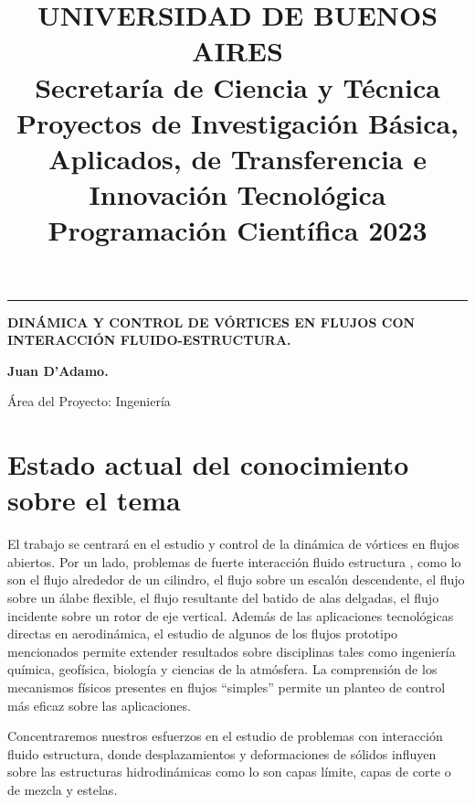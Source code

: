 \documentclass[12pt]{article}
\title{UNIVERSIDAD DE BUENOS AIRES\\Secretaría de Ciencia y Técnica\\ \large{Proyectos de Investigación Básica, Aplicados, de Transferencia e Innovación Tecnológica  Programación Científica 2023}}
\date{}
\begin{document}
    \vspace*{-4cm}
{\let\newpage\relax\maketitle}	
\thispagestyle{empty}
    \vspace*{-1cm}
\noindent \rule{ \linewidth,\parindent=0pt}{0.5mm}

\begin{tcolorbox}[colback=black!20!white,colframe=black,arc=0mm,left=0mm,top=0mm,bottom=0mm,right=0mm] 
\end{tcolorbox}
\begin{center}
\textbf{DINÁMICA Y CONTROL DE VÓRTICES EN FLUJOS CON INTERACCIÓN FLUIDO-ESTRUCTURA.}	

\textbf{Juan D'Adamo.}		
\indent

Área del Proyecto: Ingeniería	
\end{center}


\section*{Estado actual del conocimiento sobre el tema}

El trabajo se centrará en el estudio y control  de la dinámica de vórtices en flujos abiertos. 
Por un lado, problemas de fuerte interacción fluido estructura , como lo son el flujo alrededor de un cilindro, el flujo sobre un escalón descendente,  el flujo sobre un álabe flexible, el flujo resultante del batido de alas delgadas, el flujo incidente sobre un rotor de eje vertical.   Además de las aplicaciones tecnológicas directas en aerodinámica, el estudio de algunos de los flujos prototipo mencionados permite extender resultados sobre  disciplinas tales como ingeniería química, geofísica, biología y ciencias de la atmósfera. La comprensión de los mecanismos físicos presentes en  flujos ``simples'' permite un planteo de control más eficaz sobre las aplicaciones. 

Concentraremos nuestros esfuerzos en el estudio de problemas con interacción fluido estructura, donde desplazamientos y deformaciones de sólidos influyen sobre las estructuras hidrodinámicas como lo son capas límite, capas de corte o de mezcla y estelas.
\end{document}
